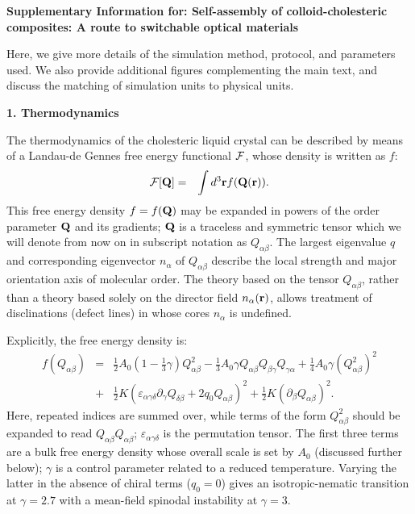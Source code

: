 \documentclass[12pt,twoside]{article}
\begin{document}
{\bf Supplementary Information for: Self-assembly of colloid-cholesteric
composites: A route to switchable optical materials}

Here, we give more details of the simulation method, protocol, and parameters used. We also provide additional figures complementing the main text, and discuss the matching of simulation units to physical units. 

{\bf 1. Thermodynamics}

The thermodynamics of the cholesteric liquid crystal can be described
by means of a  Landau-de Gennes free energy functional $\cal F$,
whose density is written as $f$:
\begin{eqnarray}
{\cal F}[{\bf Q}]&=&\int d^3{\bf r} f({\bf Q}({\bf r})).
\end{eqnarray}
This free energy density $f = f({\bf Q})$ may be expanded in powers of the
order parameter ${\bf Q}$ and its gradients; ${\bf Q}$ is a traceless 
and symmetric tensor which we will denote from now on in subscript
notation as $Q_{\alpha\beta}$.
The largest eigenvalue $q$ and corresponding eigenvector $n_\alpha$
of $Q_{\alpha\beta}$ describe the local strength and major orientation axis
of molecular order.
The theory based on the tensor $Q_{\alpha\beta}$, rather than a theory based
solely
on the director field $n_\alpha ({\bf r})$, allows treatment of disclinations
(defect lines) in whose cores $n_\alpha$ is undefined.

Explicitly, the free energy density is:
\begin{eqnarray}
f(Q_{\alpha\beta}) &=& {\textstyle \frac{1}{2}} A_0
 \left(1- {\textstyle \frac{1}{3}}\gamma \right)Q^2_{\alpha \beta}
-{\textstyle \frac{1}{3}}A_0\gamma Q_{\alpha \beta} Q_{\beta \gamma}Q_{\gamma \alpha} 
+ {\textstyle \frac{1}{4}} A_0\gamma (Q^2_{\alpha \beta})^2  \nonumber\\
&+& {\textstyle \frac{1}{2}} K(\varepsilon_{\alpha \gamma \delta}
\partial_\gamma Q_{\delta \beta} + 2 q_0 Q_{\alpha \beta})^2
+ {\textstyle \frac{1}{2}} K (\partial_\beta Q_{\alpha \beta})^2.
\label{free}
\end{eqnarray}
Here, repeated indices are summed over, while terms of the form
$Q^2_{\alpha\beta}$ should be expanded to read $Q_{\alpha\beta}Q_{\alpha\beta}$;
$\varepsilon_{\alpha\gamma\delta}$ is the permutation tensor.
The first three terms are a bulk free energy density whose overall scale
is set by $A_0$ (discussed further below); $\gamma$ is a control parameter
related to a reduced temperature. Varying the latter in the absence of
chiral terms ($q_0=0$) gives an isotropic-nematic transition at
$\gamma = 2.7$ with a mean-field spinodal instability at $\gamma = 3$.
\end{document}
